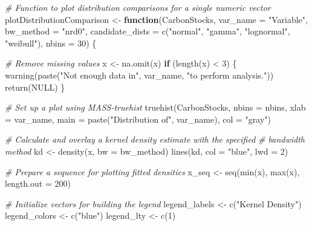 \documentclass[
]{article}
\newenvironment{Shaded}{}{}
\newcommand{\AttributeTok}[1]{\textcolor[rgb]{0.49,0.56,0.16}{#1}}
\newcommand{\CommentTok}[1]{\textcolor[rgb]{0.38,0.63,0.69}{\textit{#1}}}
\newcommand{\ConstantTok}[1]{\textcolor[rgb]{0.53,0.00,0.00}{#1}}
\newcommand{\ControlFlowTok}[1]{\textcolor[rgb]{0.00,0.44,0.13}{\textbf{#1}}}
\newcommand{\DecValTok}[1]{\textcolor[rgb]{0.25,0.63,0.44}{#1}}
\newcommand{\FunctionTok}[1]{\textcolor[rgb]{0.02,0.16,0.49}{#1}}
\newcommand{\NormalTok}[1]{#1}
\newcommand{\OtherTok}[1]{\textcolor[rgb]{0.00,0.44,0.13}{#1}}
\newcommand{\SpecialCharTok}[1]{\textcolor[rgb]{0.25,0.44,0.63}{#1}}
\newcommand{\StringTok}[1]{\textcolor[rgb]{0.25,0.44,0.63}{#1}}
\begin{document}
\begin{Shaded}
\begin{Highlighting}[]
\CommentTok{\# Function to plot distribution comparisons for a single numeric vector}
\NormalTok{plotDistributionComparison }\OtherTok{\textless{}{-}} \ControlFlowTok{function}\NormalTok{(CarbonStocks, }\AttributeTok{var\_name =} \StringTok{"Variable"}\NormalTok{, }\AttributeTok{bw\_method =} \StringTok{"nrd0"}\NormalTok{,}
    \AttributeTok{candidate\_dists =} \FunctionTok{c}\NormalTok{(}\StringTok{"normal"}\NormalTok{, }\StringTok{"gamma"}\NormalTok{, }\StringTok{"lognormal"}\NormalTok{, }\StringTok{"weibull"}\NormalTok{), }\AttributeTok{nbins =} \DecValTok{30}\NormalTok{) \{}

    \CommentTok{\# Remove missing values}
\NormalTok{    x }\OtherTok{\textless{}{-}} \FunctionTok{na.omit}\NormalTok{(x)}
    \ControlFlowTok{if}\NormalTok{ (}\FunctionTok{length}\NormalTok{(x) }\SpecialCharTok{\textless{}} \DecValTok{3}\NormalTok{) \{}
        \FunctionTok{warning}\NormalTok{(}\FunctionTok{paste}\NormalTok{(}\StringTok{"Not enough data in"}\NormalTok{, var\_name, }\StringTok{"to perform analysis."}\NormalTok{))}
        \FunctionTok{return}\NormalTok{(}\ConstantTok{NULL}\NormalTok{)}
\NormalTok{    \}}

    \CommentTok{\# Set up a plot using MASS{-}truehist}
    \FunctionTok{truehist}\NormalTok{(CarbonStocks, }\AttributeTok{nbins =}\NormalTok{ nbins, }\AttributeTok{xlab =}\NormalTok{ var\_name, }\AttributeTok{main =} \FunctionTok{paste}\NormalTok{(}\StringTok{"Distribution of"}\NormalTok{,}
\NormalTok{        var\_name), }\AttributeTok{col =} \StringTok{"gray"}\NormalTok{)}

    \CommentTok{\# Calculate and overlay a kernel density estimate with the specified}
    \CommentTok{\# bandwidth method}
\NormalTok{    kd }\OtherTok{\textless{}{-}} \FunctionTok{density}\NormalTok{(x, }\AttributeTok{bw =}\NormalTok{ bw\_method)}
    \FunctionTok{lines}\NormalTok{(kd, }\AttributeTok{col =} \StringTok{"blue"}\NormalTok{, }\AttributeTok{lwd =} \DecValTok{2}\NormalTok{)}

    \CommentTok{\# Prepare a sequence for plotting fitted densities}
\NormalTok{    x\_seq }\OtherTok{\textless{}{-}} \FunctionTok{seq}\NormalTok{(}\FunctionTok{min}\NormalTok{(x), }\FunctionTok{max}\NormalTok{(x), }\AttributeTok{length.out =} \DecValTok{200}\NormalTok{)}

    \CommentTok{\# Initialize vectors for building the legend}
\NormalTok{    legend\_labels }\OtherTok{\textless{}{-}} \FunctionTok{c}\NormalTok{(}\StringTok{"Kernel Density"}\NormalTok{)}
\NormalTok{    legend\_colors }\OtherTok{\textless{}{-}} \FunctionTok{c}\NormalTok{(}\StringTok{"blue"}\NormalTok{)}
\NormalTok{    legend\_lty }\OtherTok{\textless{}{-}} \FunctionTok{c}\NormalTok{(}\DecValTok{1}\NormalTok{)}


\end{Highlighting}
\end{Shaded}
\end{document}
